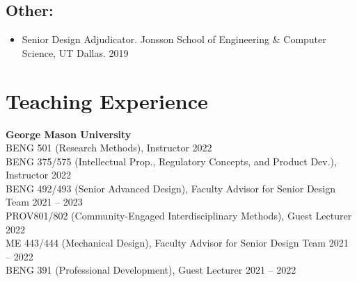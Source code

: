\documentclass[letterpaper, 10pt]{article}
\begin{document}
\subsection{Other:}
\begin{itemize}
    \item[] Senior Design Adjudicator. Jonsson School of Engineering \& Computer Science, UT Dallas. \hfill 2019 %
\end{itemize}

\section{Teaching Experience}

\textbf{George Mason University}\\
BENG 501 (Research Methods), Instructor \hfill 2022\\
BENG 375/575 (Intellectual Prop., Regulatory Concepts, and Product Dev.), Instructor \hfill 2022\\
BENG 492/493 (Senior Advanced Design), Faculty Advisor for Senior Design Team \hfill 2021 -- 2023\\
PROV801/802 (Community-Engaged Interdisciplinary Methods), Guest Lecturer \hfill 2022\\
ME 443/444 (Mechanical Design), Faculty Advisor for Senior Design Team \hfill 2021 -- 2022\\
BENG 391 (Professional Development), Guest Lecturer \hfill 2021 -- 2022\\
\end{document}

